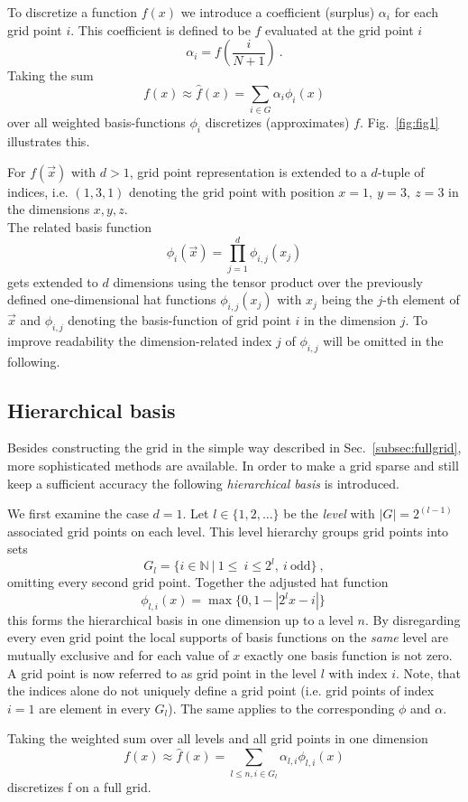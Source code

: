 \par

To discretize a function $f(x)$ we introduce a coefficient (surplus)
$\alpha_i$ for each grid point $i$. This coefficient is defined to be
$f$ evaluated at the grid point $i$
$$\alpha_i = f(\frac{i}{N+1}) \ .$$
Taking the sum
$$ f(x) \approx  \hat{f}(x) = \sum_{i \in G}{\alpha_i \phi_i(x)} $$
over all weighted basis-functions $\phi_i$ discretizes (approximates) $f$.
Fig.~\ref{fig:fig1} illustrates this.

\par

For $f(\vec{x})$ with $d > 1$, grid point representation is extended to
a $d$-tuple of indices, i.e. $(1,3,1)$ denoting the grid point with position
$x = 1, \ y = 3, \ z = 3$ in the dimensions $x,y,z$. \\
The related basis function
$$\phi_i(\vec{x}) = \prod_{j=1}^d{\phi_{i,j}(x_j)}$$
gets extended to $d$ dimensions using the tensor
product over the previously defined one-dimensional hat functions
$\phi_{i,j}(x_j)$ with $x_j$ being the $j$-th element of $\vec{x}$ and
$\phi_{i,j}$ denoting the basis-function of grid point $i$ in the dimension
$j$. To improve readability the dimension-related index $j$ of $\phi_{i,j}$
will be omitted in the following.

\subsection{Hierarchical basis}
Besides constructing the grid in the simple way described in Sec.~\ref{subsec:fullgrid},
more sophisticated methods are available. In order to make a grid
sparse and still keep a sufficient accuracy the following
\emph{hierarchical basis} is introduced.
\par
We first examine the case $d = 1$.
Let $l \in \{1,2,\dots\}$ be the \emph{level} with $|G| = 2^{(l-1)}$ associated
grid points on each level. This level hierarchy groups grid points
into sets
$$G_l = \{i \in \mathbb{N} \ | \ 1 \leq \ i \leq 2^l, \ i \ \text{odd}\} \ ,$$
omitting every second grid point. Together the adjusted hat function
$$\phi_{l,i}(x) = \max\{0, 1 - |2^lx - i|\} \ $$
this forms the hierarchical basis in one dimension up to a level $n$.
By disregarding every
even grid point the local supports of basis functions on the \emph{same}
level are mutually exclusive and for each value of $x$ exactly one basis
function is not zero. \\
A grid point is now referred to as grid point in the level $l$ with index $i$.
Note, that the indices alone do not uniquely define a grid point (i.e. grid
points of index $i = 1$ are element in every $G_l$). The same applies to
the corresponding $\phi$ and $\alpha$.
\par
Taking the weighted sum over all levels and all grid points in one dimension
$$ f(x) \approx \hat{f}(x) =  \sum_{l \leq n, i \in G_l}{\alpha_{l,i}\phi_{l,i}(x)}$$
discretizes f on a full grid.


